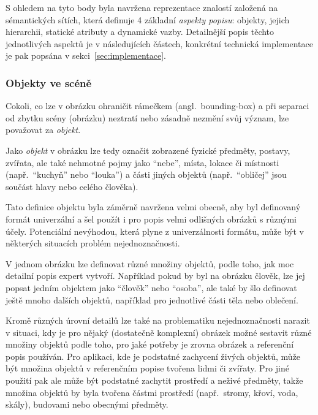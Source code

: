 S ohledem na tyto body byla navržena reprezentace znalostí založená na sémantických sítích, která definuje 4 základní \emph{aspekty popisu}: objekty, jejich hierarchii,
statické atributy a dynamické vazby.
Detailnější popis těchto jednotlivých aspektů je v následujících částech, konkrétní technická implementace je pak popsána v sekci~\ref{sec:implementace}.

\subsubsection{Objekty ve scéně}\label{subsubsec:objekty_ve_scene}
\newcommand{\objekt}{{\color{red!70!black}\texttt{objekt}}}
Cokoli, co lze v obrázku ohraničit rámečkem (angl.~bounding-box)
a při separaci od zbytku scény (obrázku) neztratí nebo zásadně nezmění svůj význam,
lze považovat za \emph{objekt}.

Jako \emph{objekt} v obrázku lze tedy označit zobrazené fyzické předměty, postavy, zvířata, ale také nehmotné pojmy jako \enquote{nebe},
místa, lokace či místnosti (např.~\enquote{kuchyň} nebo \enquote{louka}) a části jiných objektů (např.~\enquote{obličej} jsou součást hlavy nebo celého člověka).

Tato definice objektu byla záměrně navržena velmi obecně, aby byl definovaný formát univerzální a šel použít i pro popis velmi odlišných obrázků s různými účely.
Potenciální nevýhodou, která plyne z univerzálnosti formátu, může být v některých situacích problém nejednoznačnosti.

V jednom obrázku lze definovat různé množiny objektů, podle toho, jak moc detailní popis expert vytvoří.
Například pokud by byl na obrázku člověk, lze jej popsat jedním objektem jako \enquote{člověk} nebo \enquote{osoba},
ale také by šlo definovat ještě mnoho dalších objektů, například pro jednotlivé části těla nebo oblečení.

Kromě různých úrovní detailů lze také na problematiku nejednoznačnosti narazit v situaci, kdy je pro nějaký (dostatečně komplexní) obrázek
možné sestavit různé množiny objektů podle toho, pro jaké potřeby je zrovna obrázek a referenční popis používán.
Pro aplikaci, kde je podstatné zachycení živých objektů, může být množina objektů v referenčním popise tvořena lidmi či zvířaty.
Pro jiné použití pak ale může být podstatné zachytit prostředí a neživé předměty,
takže množina objektů by byla tvořena částmi prostředí (např.~stromy, křoví, voda, skály), budovami nebo obecnými předměty.

